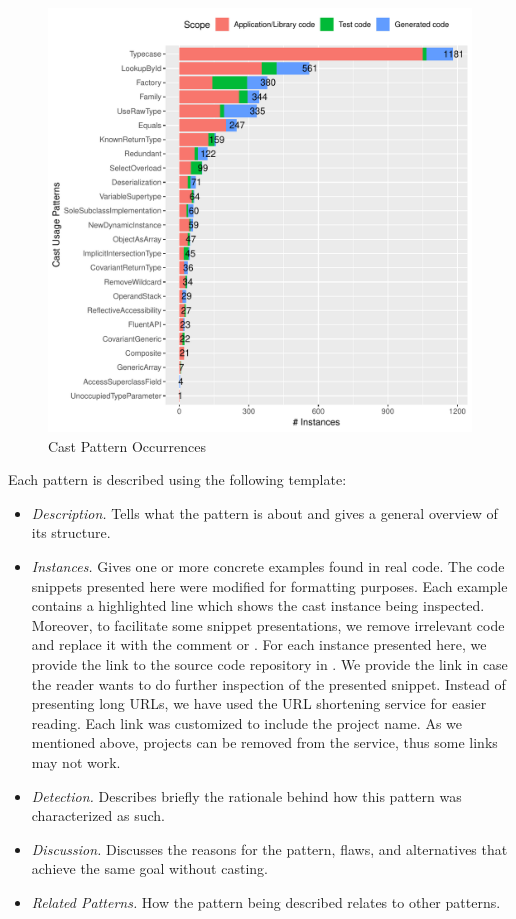 \begin{figure}[ht!]
\centering
\includegraphics[width=\textwidth]{analysis/table-patterns.pdf}
\caption{Cast Pattern Occurrences} \label{fig:patterns}
\end{figure}

Each pattern is described using the following template:

\begin{itemize}
\item \textit{Description.}
Tells what the pattern is about and gives a general overview of its structure.
\item \textit{Instances.}
Gives one or more concrete examples found in real code.
The code snippets presented here were modified for formatting purposes.
Each example contains a highlighted line which shows the cast instance being inspected.
Moreover, to facilitate some snippet presentations,
we remove irrelevant code and replace it with the
comment \code{// [...]} or \code{/* [...] */}.
For each instance presented here, we provide the link to the source code repository in \lgtm{}.
We provide the link in case the reader wants to do further inspection of the presented snippet.
Instead of presenting long \lgtm{} URLs, we have used the URL shortening service
\href{https://bitly.com/}{\bitly} for easier reading.
Each \bitly{} link was customized to include the project name.
As we mentioned above, projects can be removed from the \lgtm{} service,
thus some links may not work.
\item \textit{Detection.}
Describes briefly the rationale behind how this pattern was characterized as such.
\item \textit{Discussion.}
Discusses the reasons for the pattern, flaws, and alternatives that achieve the same goal without casting.
\item \textit{Related Patterns.}
How the pattern being described relates to other patterns.
\end{itemize}


